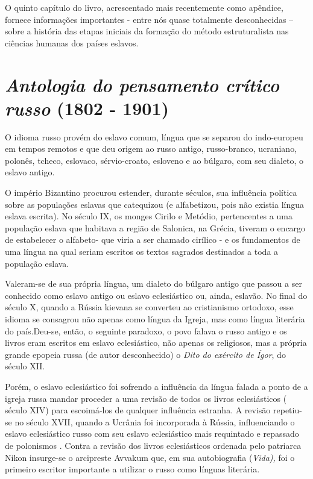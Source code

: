 O quinto capítulo do livro, acrescentado mais recentemente como
apêndice, fornece informações importantes - entre nós quase totalmente
desconhecidas -- sobre a história das etapas iniciais da formação do
método estruturalista nas ciências humanas dos países eslavos.

\chapter{\emph{Antologia do pensamento crítico russo} (1802 - 1901) }

O idioma russo provém do eslavo comum, língua que se separou do
indo-europeu em tempos remotos e que deu origem ao russo antigo,
russo-branco, ucraniano, polonês, tcheco, eslovaco, sérvio-croato,
esloveno e ao búlgaro, com seu dialeto, o eslavo antigo.

O império Bizantino procurou estender, durante séculos, sua influência
política sobre as populações eslavas que catequizou (e alfabetizou, pois
não existia língua eslava escrita). No século IX, os monges Cirilo e
Metódio, pertencentes a uma população eslava que habitava a região de
Salonica, na Grécia, tiveram o encargo de estabelecer o alfabeto- que
viria a ser chamado cirílico - e os fundamentos de uma língua na qual
seriam escritos os textos sagrados destinados a toda a população eslava.

Valeram-se de sua própria língua, um dialeto do búlgaro antigo que
passou a ser conhecido como eslavo antigo ou eslavo eclesiástico ou,
ainda, eslavão. No final do século X, quando a Rússia kievana se
converteu ao cristianismo ortodoxo, esse idioma se consagrou não apenas
como língua da Igreja, mas como língua literária do país.Deu-se, então,
o seguinte paradoxo, o povo falava o russo antigo e os livros eram
escritos em eslavo eclesiástico, não apenas os religiosos, mas a própria
grande epopeia russa (de autor desconhecido) o \emph{Dito do exército de
Ígor}, do século XII.

Porém, o eslavo eclesiástico foi sofrendo a influência da língua falada
a ponto de a igreja russa mandar proceder a uma revisão de todos os
livros eclesiásticos ( século XIV) para escoimá-los de qualquer
influência estranha. A revisão repetiu-se no século XVII, quando a
Ucrânia foi incorporada à Rússia, influenciando o eslavo eclesiástico
russo com seu eslavo eclesiástico mais requintado e repassado de
polonismos . Contra a revisão dos livros eclesiásticos ordenada pelo
patriarca Nikon insurge-se o arcipreste Avvakum que, em sua
autobiografia (\emph{Vida),} foi o primeiro escritor importante a
utilizar o russo como línguas literária.

